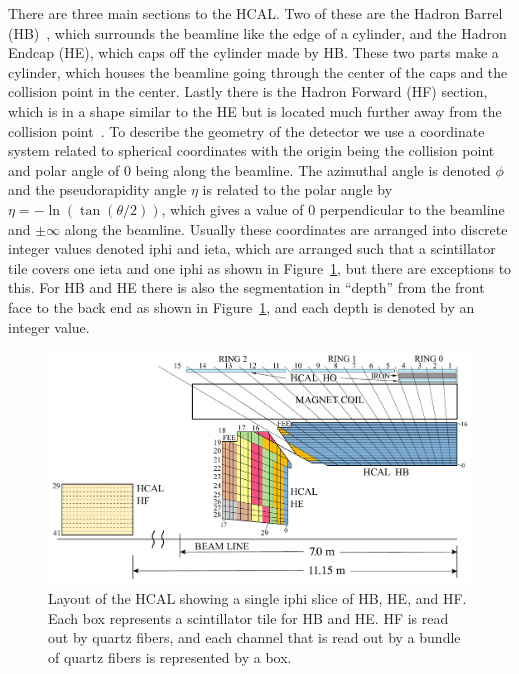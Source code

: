 There are three main sections to the HCAL. Two of these are the Hadron Barrel (HB)~\cite{HB}, which surrounds the beamline like the edge of a cylinder, and the Hadron Endcap (HE), which caps off the cylinder made by HB. These two parts make a cylinder, which houses the beamline going through the center of the caps and the collision point in the center. Lastly there is the Hadron Forward (HF) section, which is in a shape similar to the HE but is located much further away from the collision point~\cite{HF}. To describe the geometry of the detector we use a coordinate system related to spherical coordinates with the origin being the collision point and polar angle of 0 being along the beamline. The azimuthal angle is denoted $\phi$ and the pseudorapidity angle $\eta$ is related to the polar angle by $\eta = -\ln(\tan(\theta/2))$, which gives a value of 0 perpendicular to the beamline and $\pm\infty$ along the beamline. Usually these coordinates are arranged into discrete integer values denoted iphi and ieta, which are arranged such that a scintillator tile covers one ieta and one iphi as shown in Figure~\ref{fig:Depth}, but there are exceptions to this. For HB and HE there is also the segmentation in ``depth'' from the front face to the back end as shown in Figure~\ref{fig:Depth}, and each depth is denoted by an integer value. 


\begin{figure}
\centering
\includegraphics[width=\linewidth]{Figures/Depthsegmentation.pdf}
\caption{Layout of the HCAL showing a single iphi slice of HB, HE, and HF. Each box represents a scintillator tile for HB and HE. HF is read out by quartz fibers, and each channel that is read out by a bundle of quartz fibers is represented by a box.}
\label{fig:Depth}
\end{figure}


